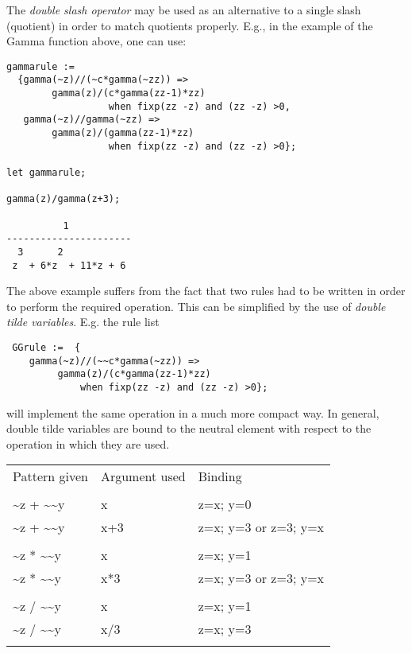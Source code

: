 \hypertarget{reserved:doubleslashop}{}
The \emph{double slash operator} may be used as an alternative to a single
slash (quotient) in order to match quotients properly.  E.g., in the
example of the Gamma function above, one can use:
\begin{verbatim}
gammarule :=
  {gamma(~z)//(~c*gamma(~zz)) =>
        gamma(z)/(c*gamma(zz-1)*zz)
                  when fixp(zz -z) and (zz -z) >0,
   gamma(~z)//gamma(~zz) =>
        gamma(z)/(gamma(zz-1)*zz)
                  when fixp(zz -z) and (zz -z) >0};

let gammarule;

gamma(z)/gamma(z+3);

          1
----------------------
  3      2
 z  + 6*z  + 11*z + 6
\end{verbatim}
The above example suffers from the fact that two rules had to be
written in order to perform the required operation. This can be simplified
by the use of \emph{double tilde variables}. E.g. the rule list
\begin{verbatim}
 GGrule :=  {
    gamma(~z)//(~~c*gamma(~zz)) =>
         gamma(z)/(c*gamma(zz-1)*zz)
             when fixp(zz -z) and (zz -z) >0};
\end{verbatim}
will implement the same operation in a much more compact way.
In general, double tilde variables are bound to the neutral element
with respect to the operation in which they are used.

\begin{tabular}{lll}

Pattern given & Argument used & Binding  \\
\\
\textasciitilde z + \textasciitilde \textasciitilde y  &   x   &  z=x; y=0  \\   
\textasciitilde z + \textasciitilde \textasciitilde y  &   x+3 &  z=x; y=3  or  z=3; y=x \\ 
\\
\textasciitilde z * \textasciitilde \textasciitilde y  &   x   &  z=x; y=1\\
\textasciitilde z * \textasciitilde \textasciitilde y  &   x*3 &  z=x; y=3  or  z=3; y=x\\
\\
\textasciitilde z / \textasciitilde \textasciitilde y  &    x   &  z=x; y=1\\
\textasciitilde z / \textasciitilde \textasciitilde y  &    x/3 &  z=x; y=3  \\
\\
\end{tabular}

